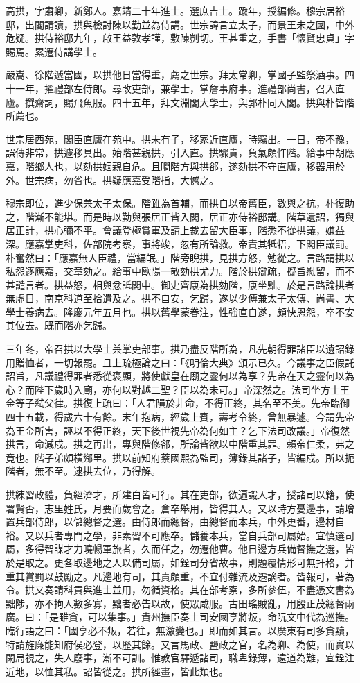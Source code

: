 \begin{pinyinscope}
高拱，字肅卿，新鄭人。嘉靖二十年進士。選庶吉士。踰年，授編修。穆宗居裕邸，出閣請讀，拱與檢討陳以勤並為侍講。世宗諱言立太子，而景王未之國，中外危疑。拱侍裕邸九年，啟王益敦孝謹，敷陳剴切。王甚重之，手書「懷賢忠貞」字賜焉。累遷侍講學士。

嚴嵩、徐階遞當國，以拱他日當得重，薦之世宗。拜太常卿，掌國子監祭酒事。四十一年，擢禮部左侍郎。尋改吏部，兼學士，掌詹事府事。進禮部尚書，召入直廬。撰齋詞，賜飛魚服。四十五年，拜文淵閣大學士，與郭朴同入閣。拱與朴皆階所薦也。

世宗居西苑，閣臣直廬在苑中。拱未有子，移家近直廬，時竊出。一日，帝不豫，誤傳非常，拱遽移具出。始階甚親拱，引入直。拱驟貴，負氣頗忤階。給事中胡應嘉，階鄉人也，以劾拱姻親自危。且瞷階方與拱郤，遂劾拱不守直廬，移器用於外。世宗病，勿省也。拱疑應嘉受階指，大憾之。

穆宗即位，進少保兼太子太保。階雖為首輔，而拱自以帝舊臣，數與之抗，朴復助之，階漸不能堪。而是時以勤與張居正皆入閣，居正亦侍裕邸講。階草遺詔，獨與居正計，拱心彌不平。會議登極賞軍及請上裁去留大臣事，階悉不從拱議，嫌益深。應嘉掌吏科，佐部院考察，事將竣，忽有所論救。帝責其牴牾，下閣臣議罰。朴奮然曰：「應嘉無人臣禮，當編氓。」階旁睨拱，見拱方怒，勉從之。言路謂拱以私怨逐應嘉，交章劾之。給事中歐陽一敬劾拱尤力。階於拱辯疏，擬旨慰留，而不甚譴言者。拱益怒，相與忿詆閣中。御史齊康為拱劾階，康坐黜。於是言路論拱者無虛日，南京科道至拾遺及之。拱不自安，乞歸，遂以少傅兼太子太傅、尚書、大學士養病去。隆慶元年五月也。拱以舊學蒙眷注，性強直自遂，頗快恩怨，卒不安其位去。既而階亦乞歸。

三年冬，帝召拱以大學士兼掌吏部事。拱乃盡反階所為，凡先朝得罪諸臣以遺詔錄用贈恤者，一切報罷。且上疏極論之曰：「《明倫大典》頒示已久。今議事之臣假託詔旨，凡議禮得罪者悉從褒顯，將使獻皇在廟之靈何以為享？先帝在天之靈何以為心？而陛下歲時入廟，亦何以對越二聖？臣以為未可。」帝深然之。法司坐方士王金等子弒父律。拱復上疏曰：「人君隕於非命，不得正終，其名至不美。先帝臨御四十五載，得歲六十有餘。末年抱病，經歲上賓，壽考令終，曾無暴遽。今謂先帝為王金所害，誣以不得正終，天下後世視先帝為何如主？乞下法司改議。」帝復然拱言，命減戍。拱之再出，專與階修郤，所論皆欲以中階重其罪。賴帝仁柔，弗之竟也。階子弟頗橫鄉里。拱以前知府蔡國熙為監司，簿錄其諸子，皆編戍。所以扼階者，無不至。逮拱去位，乃得解。

拱練習政體，負經濟才，所建白皆可行。其在吏部，欲遍識人才，授諸司以籍，使署賢否，志里姓氏，月要而歲會之。倉卒舉用，皆得其人。又以時方憂邊事，請增置兵部侍郎，以儲總督之選。由侍郎而總督，由總督而本兵，中外更番，邊材自裕。又以兵者專門之學，非素習不可應卒。儲養本兵，當自兵部司屬始。宜慎選司屬，多得智謀才力曉暢軍旅者，久而任之，勿遷他曹。他日邊方兵備督撫之選，皆於是取之。更各取邊地之人以備司屬，如銓司分省故事，則題覆情形可無扞格，并重其賞罰以鼓勵之。凡邊地有司，其責頗重，不宜付雜流及遷謫者。皆報可，著為令。拱又奏請科貢與進士並用，勿循資格。其在部考察，多所參伍，不盡憑文書為黜陟，亦不拘人數多寡，黜者必告以故，使眾咸服。古田瑤賊亂，用殷正茂總督兩廣。曰：「是雖貪，可以集事。」貴州撫臣奏土司安國亨將叛，命阮文中代為巡撫。臨行語之曰：「國亨必不叛，若往，無激變也。」即而如其言。以廣東有司多貪黷，特請旌廉能知府侯必登，以歷其餘。又言馬政、鹽政之官，名為卿、為使，而實以閑局視之，失人廢事，漸不可訓。惟教官驛遞諸司，職卑錄薄，遠道為難，宜銓注近地，以恤其私。詔皆從之。拱所經畫，皆此類也。


\end{pinyinscope}
